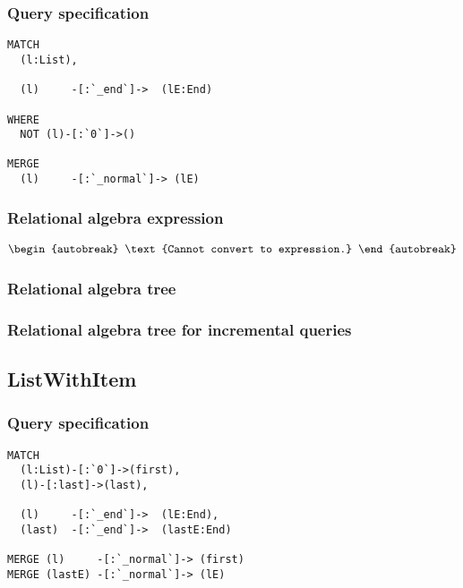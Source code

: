 \subsubsection*{Query specification}

\begin{lstlisting}
MATCH
  (l:List),

  (l)     -[:`_end`]->  (lE:End)

WHERE
  NOT (l)-[:`0`]->()

MERGE
  (l)     -[:`_normal`]-> (lE)
\end{lstlisting}

\subsubsection*{Relational algebra expression}

\begin{align*}
\begin{autobreak}
\text{Cannot convert to expression.}
\end{autobreak}
\end{align*}

\subsubsection*{Relational algebra tree}


\subsubsection*{Relational algebra tree for incremental queries}

\subsection{ListWithItem}

\subsubsection*{Query specification}

\begin{lstlisting}
MATCH
  (l:List)-[:`0`]->(first),
  (l)-[:last]->(last),

  (l)     -[:`_end`]->  (lE:End),
  (last)  -[:`_end`]->  (lastE:End)

MERGE (l)     -[:`_normal`]-> (first)
MERGE (lastE) -[:`_normal`]-> (lE)
\end{lstlisting}

